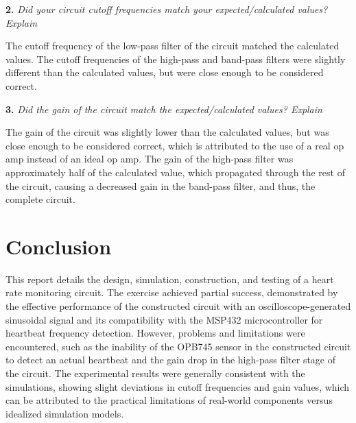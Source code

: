 \documentclass[CMPE]{KGCOEReport}
\begin{document}
\textbf{2.} \emph{Did your circuit cutoff frequencies match your expected/calculated values? Explain}

The cutoff frequency of the low-pass filter of the circuit matched the calculated values. The cutoff frequencies of the high-pass and band-pass filters were slightly different than the calculated values, but were close enough to be considered correct.

\bigskip

\textbf{3.} \emph{Did the gain of the circuit match the expected/calculated values? Explain}

The gain of the circuit was slightly lower than the calculated values, but was close enough to be considered correct, which is attributed to the use of a real op amp instead of an ideal op amp. The gain of the high-pass filter was approximately half of the calculated value, which propagated through the rest of the circuit, causing a decreased gain in the band-pass filter, and thus, the complete circuit.

\section*{Conclusion}

This report details the design, simulation, construction, and testing of a heart rate monitoring circuit. The exercise achieved partial success, demonstrated by the effective performance of the constructed circuit with an oscilloscope-generated sinusoidal signal and its compatibility with the MSP432 microcontroller for heartbeat frequency detection. However, problems and limitations were encountered, such as the inability of the OPB745 sensor in the constructed circuit to detect an actual heartbeat and the gain drop in the high-pass filter stage of the circuit. The experimental results were generally consistent with the simulations, showing slight deviations in cutoff frequencies and gain values, which can be attributed to the practical limitations of real-world components versus idealized simulation models.
\end{document}
